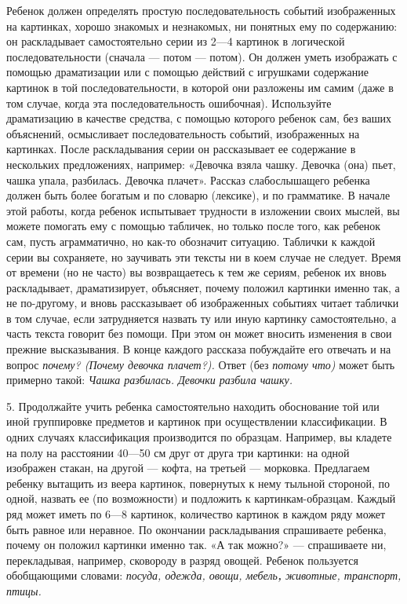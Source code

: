 \documentclass[a5paper]{book}
\renewcommand{\emph}[1]{\textit{#1}}
\begin{document}
Ребенок должен определять простую последовательность событий
изображенных на картинках, хорошо знакомых и незнакомых, ни понятных ему
по содержанию: он раскладывает самостоятельно серии из 2---4 картинок в
логической последовательности (сначала --- потом --- потом). Он должен
уметь изображать с помощью драматизации или с помощью действий с
игрушками содержание картинок в той последовательности, в которой они
разложены им самим (даже в том случае, когда эта последовательность
ошибочная). Используйте драматизацию в качестве средства, с помощью
которого ребенок сам, без ваших объяснений, осмысливает
последовательность событий, изображенных на картинках. После
раскладывания серии он рассказывает ее содержание в нескольких
предложениях, например: «Девочка взяла чашку. Девочка (она) пьет, чашка
упала, разбилась. Девочка плачет». Рассказ слабослышащего ребенка должен
быть более богатым и по словарю (лексике), и по грамматике. В начале
этой работы, когда ребенок испытывает трудности в изложении своих
мыслей, вы можете помогать ему с помощью табличек, но только после того,
как ребенок сам, пусть аграмматично, но как-то обозначит ситуацию.
Таблички к каждой серии вы сохраняете, но заучивать эти тексты ни в коем
случае не следует. Время от времени (но не часто) вы возвращаетесь к тем
же сериям, ребенок их вновь раскладывает, драматизирует, объясняет,
почему положил картинки именно так, а не по-другому, и вновь
рассказывает об изображенных событиях читает таблички в том случае, если
затрудняется назвать ту или иную картинку самостоятельно, а часть текста
говорит без помощи. При этом он может вносить изменения в свои прежние
высказывания. В конце каждого рассказа побуждайте его отвечать и на
вопрос \emph{почему? (Почему девочка плачет?).} Ответ (без \emph{потому
что)} может быть примерно такой: \emph{Чашка разбилась. Девочки разбила
чашку.}

5. Продолжайте учить ребенка самостоятельно находить обоснование той или
иной группировке предметов и картинок при осуществлении классификации. В
одних случаях классификация производится по образцам. Например, вы
кладете на полу на расстоянии 40---50 см друг от друга три картинки: на
одной изображен стакан, на другой --- кофта, на третьей --- морковка.
Предлагаем ребенку вытащить из веера картинок, повернутых к нему тыльной
стороной, по одной, назвать ее (по возможности) и подложить к
картинкам-образцам. Каждый ряд может иметь по 6---8 картинок, количество
картинок в каждом ряду может быть равное или неравное. По окончании
раскладывания спрашиваете ребенка, почему он положил картинки именно
так. «А так можно?» --- спрашиваете ни, перекладывая, например,
сковороду в разряд овощей. Ребенок пользуется обобщающими словами:
\emph{посуда, одежда, овощи, мебель\textbf{,} животные, транспорт,
птицы.}
\end{document}

